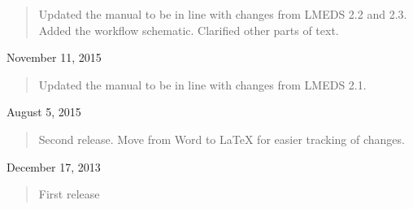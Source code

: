 \begin{quote}
Updated the manual to be in line with changes from LMEDS 2.2 and 2.3.  Added the workflow schematic.  Clarified other parts of text.
\end{quote}

November 11, 2015

\begin{quote}
Updated the manual to be in line with changes from LMEDS 2.1.
\end{quote}

August 5, 2015

\begin{quote}
Second release.  Move from Word to LaTeX for easier tracking of changes.
\end{quote}

December 17, 2013


\begin{quote}
First release
\end{quote}


